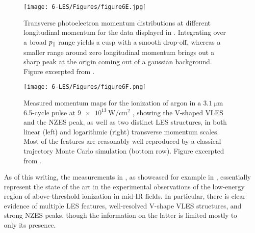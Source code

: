 \begin{figure}[htb]
  \centering
  \texttt{[image: 6-LES/Figures/figure6E.jpg]}
  \caption[
  Experimental transverse photoelectron momentum spectra at different longitudinal momenta, observed by Pullen et al.]{
  Transverse photoelectron momentum distributions at different longitudinal momentum for the data displayed in . Integrating over a broad ${p_{\parallel}}$ range yields a cusp with a smooth drop-off, whereas a smaller range around zero longitudinal momentum brings out a sharp peak at the origin coming out of a gaussian background.
  Figure excerpted from .
  }
\label{f6-pullen-original-transverse-spectrum}
\end{figure}





\begin{figure}[h!t]
  \vspace{2mm}
  \centering
  \subfigure{\label{f6-wolter-original-figure-a}}
  \subfigure{\label{f6-wolter-original-figure-b}}
  \subfigure{\label{f6-wolter-original-figure-c}}
  \subfigure{\label{f6-wolter-original-figure-d}}
  \texttt{[image: 6-LES/Figures/figure6F.png]}
  \caption[
  Measured and CTMC high-resolution photoelectron momentum maps showing LES, VLES and ZES structures, observed by Wolter et al.
  ]{
  Measured momentum maps for the ionization of argon in a $\SI{3.1}{\micro\meter}$ 6.5-cycle pulse at $\SI{9e13}{\watt/\centi\meter^2}$ \cite{ZES_paper}, showing the V-shaped VLES and the NZES peak, as well as two distinct LES structures, in both linear (left) and logarithmic (right) transverse momentum scales. Most of the features are reasonably well reproduced by a classical trajectory Monte Carlo simulation (bottom row).
  Figure excerpted from .
  }
\label{f6-wolter-original-figure}
\end{figure}






As of this writing, the measurements in , as showcased for example in , essentially represent the state of the art in the experimental observations of the low-energy region of above-threshold ionization in mid-IR fields. In particular, there is clear evidence of multiple LES features, well-resolved V-shape VLES structures, and strong NZES peaks, though the information on the latter is limited mostly to only its presence.





